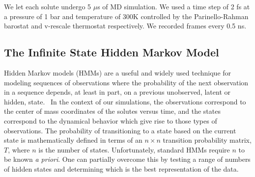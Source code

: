 \documentclass{article}
\begin{document}
  We let each solute undergo 5 $\mu$s of MD simulation. We used a time step of 2 fs
  at a pressure of 1 bar and temperature of 300K controlled by the Parinello-Rahman 
  barostat and v-rescale thermostat respectively. We recorded frames every 0.5 ns.

  \subsection{The Infinite State Hidden Markov Model}\label{method:IHMM}
  
  Hidden Markov models (HMMs) are a useful and widely used technique for modeling
  sequences of observations where the probability of the next observation in a 
  sequence depends, at least in part, on a previous unobserved, latent or hidden,
  state.~\cite{beal_infinite_2002} In the context of our simulations, the observations
  correspond to the center of mass coordinates of the solutes versus time, and the
  states correspond to the dynamical behavior which give rise to those types
  of observations. The probability of transitioning to a state based on the current
  state is mathematically defined in terms of an $n\times n$ transition probability
  matrix, $T$, where $n$ is the number of states. Unfortunately, standard HMMs 
  require $n$ to be known \textit{a priori}. One can partially overcome this by 
  testing a range of numbers of hidden states and determining which is the best 
  representation of the data.
  
\end{document}
